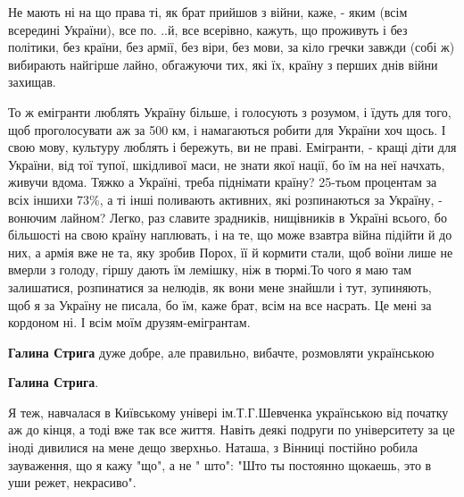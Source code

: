 \begin{itemize}
\begin{itemize}
\begin{itemize}
Не мають ні на що права ті, як брат прийшов з війни, каже, - яким (всім
всередині України), все по. ..й, все всерівно, кажуть, що проживуть і без
політики, без країни, без армії, без віри, без мови, за кіло гречки завжди
(собі ж) вибирають найгірше лайно, обгажуючи тих, які їх, країну з перших днів
війни захищав. 

То ж емігранти люблять Україну більше, і голосують з розумом, і їдуть для того,
щоб проголосувати аж за 500 км, і намагаються робити для України хоч щось. І
свою мову, культуру люблять і бережуть, ви не праві. Емігранти, - кращі діти
для України, від тої тупої, шкідливої маси, не знати якої нації, бо їм на неї
начхать, живучи вдома. Тяжко а Україні, треба піднімати країну? 25-тьом
процентам за всіх іншихи 73\%, а ті інші поливають активних, які розпинаються
за Україну, - вонючим лайном? Легко, раз славите зрадників, нищівників в
Україні всього, бо більшості на свою країну наплювать, і на те, що може взавтра
війна підійти й до них, а армія вже не та, яку зробив Порох, її й кормити
стали, щоб воїни лише не вмерли з голоду, гіршу дають їм лемішку, ніж в
тюрмі.То чого я маю там залишатися, розпинатися за нелюдів, як вони мене
знайшли і тут, зупиняють, щоб я за Україну не писала, бо їм, каже брат, всім на
все насрать. Це мені за кордоном ні. І всім моїм друзям-емігрантам.

\end{itemize}

 
\textbf{Галина Стрига} дуже добре, але правильно, вибачте, розмовляти українською

 
\textbf{Галина Стрига}. 

Я теж, навчалася в Київському універі ім.Т.Г.Шевченка українською від початку
аж до кінця, а тоді вже так все життя. Навіть деякі подруги по університету за
це іноді дивилися на мене дещо зверхньо. Наташа, з Вінниці постійно робила
зауваження, що я кажу "що", а не " што": "Што ты постоянно щокаешь, это в уши
режет, некрасиво". 


\end{itemize}
\end{itemize}
